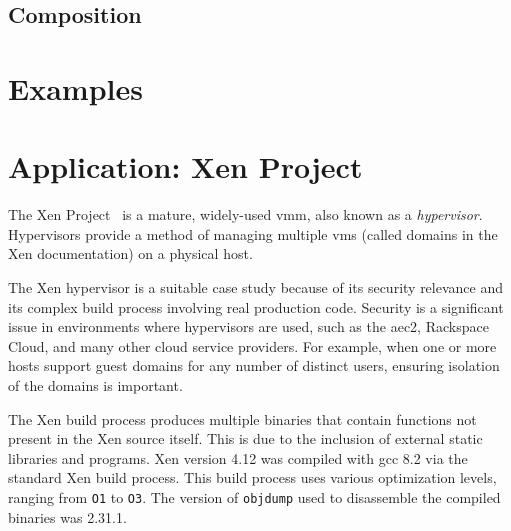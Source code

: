 \subsection{Composition}\label{sse:fmuc_comp}

\section{Examples}\label{se:syntax_example}

\section{Application: Xen Project}\label{se:xen}
The Xen Project~\citep{chisnall2008definitive}
is a mature, widely-used \ac{vmm}, also known as a \emph{hypervisor}.
Hypervisors provide a method of managing multiple
\acp{vm} (called domains in the Xen documentation) on a physical host.

The Xen hypervisor is a suitable case study because of its security relevance
and its complex build process involving real production code.
Security is a significant issue in environments where hypervisors are used,
such as the \ac{aec2}, Rackspace Cloud, and many other cloud service providers.
For example, when one or more hosts support guest domains
for any number of distinct users,
ensuring isolation of the domains is important.

The Xen build process produces multiple binaries
that contain functions not present in the Xen source itself.
This is due to the inclusion of external static libraries and programs.
Xen version 4.12 was compiled with \ac{gcc} 8.2 via the standard Xen build process.
This build process uses various optimization levels, ranging from \texttt{O1} to \texttt{O3}.
The version of \texttt{objdump} used to disassemble the compiled binaries
was 2.31.1.


